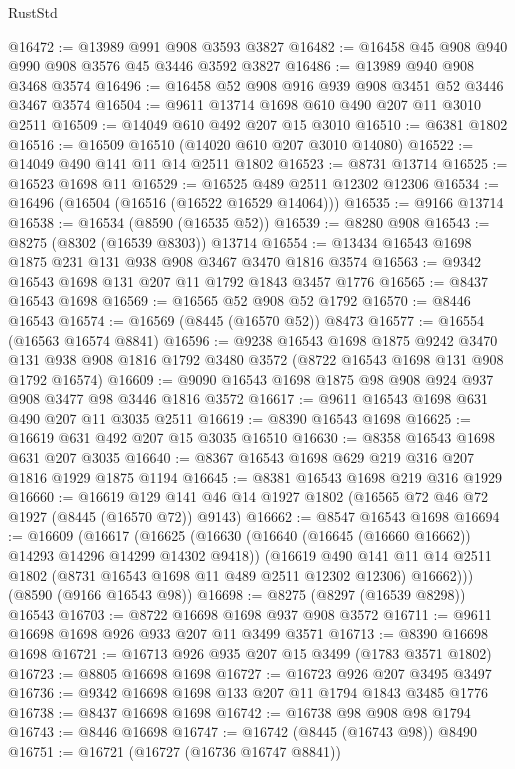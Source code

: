 \begin{lexlean}{RustStd}
\begin{coremodule}
@16472 := @13989 @991 @908 @3593 @3827
@16482 := @16458 @45 @908 @940 @990 @908 @3576 @45 @3446 @3592 @3827
@16486 := @13989 @940 @908 @3468 @3574
@16496 := @16458 @52 @908 @916 @939 @908 @3451 @52 @3446 @3467 @3574
@16504 := @9611 @13714 @1698 @610 @490 @207 @11 @3010 @2511
@16509 := @14049 @610 @492 @207 @15 @3010
@16510 := @6381 @1802
@16516 := @16509 @16510 (@14020 @610 @207 @3010 @14080)
@16522 := @14049 @490 @141 @11 @14 @2511 @1802
@16523 := @8731 @13714
@16525 := @16523 @1698 @11
@16529 := @16525 @489 @2511 @12302 @12306
@16534 := @16496 (@16504 (@16516 (@16522 @16529 @14064)))
@16535 := @9166 @13714
@16538 := @16534 (@8590 (@16535 @52))
@16539 := @8280 @908
@16543 := @8275 (@8302 (@16539 @8303)) @13714
@16554 := @13434 @16543 @1698 @1875 @231 @131 @938 @908 @3467 @3470 @1816 @3574
@16563 := @9342 @16543 @1698 @131 @207 @11 @1792 @1843 @3457 @1776
@16565 := @8437 @16543 @1698
@16569 := @16565 @52 @908 @52 @1792
@16570 := @8446 @16543
@16574 := @16569 (@8445 (@16570 @52)) @8473
@16577 := @16554 (@16563 @16574 @8841)
@16596 := @9238
    @16543
    @1698
    @1875
    @9242
    @3470
    @131
    @938
    @908
    @1816
    @1792
    @3480
    @3572
    (@8722 @16543 @1698 @131 @908 @1792 @16574)
@16609 := @9090 @16543 @1698 @1875 @98 @908 @924 @937 @908 @3477 @98 @3446 @1816 @3572
@16617 := @9611 @16543 @1698 @631 @490 @207 @11 @3035 @2511
@16619 := @8390 @16543 @1698
@16625 := @16619 @631 @492 @207 @15 @3035 @16510
@16630 := @8358 @16543 @1698 @631 @207 @3035
@16640 := @8367 @16543 @1698 @629 @219 @316 @207 @1816 @1929 @1875 @1194
@16645 := @8381 @16543 @1698 @219 @316 @1929
@16660 := @16619 @129 @141 @46 @14 @1927 @1802 (@16565 @72 @46 @72 @1927 (@8445 (@16570 @72)) @9143)
@16662 := @8547 @16543 @1698
@16694 := @16609
    (@16617
      (@16625
        (@16630 (@16640 (@16645 (@16660 @16662)) @14293 @14296 @14299 @14302 @9418))
        (@16619
          @490
          @141
          @11
          @14
          @2511
          @1802
          (@8731 @16543 @1698 @11 @489 @2511 @12302 @12306)
          @16662)))
    (@8590 (@9166 @16543 @98))
@16698 := @8275 (@8297 (@16539 @8298)) @16543
@16703 := @8722 @16698 @1698 @937 @908 @3572
@16711 := @9611 @16698 @1698 @926 @933 @207 @11 @3499 @3571
@16713 := @8390 @16698 @1698
@16721 := @16713 @926 @935 @207 @15 @3499 (@1783 @3571 @1802)
@16723 := @8805 @16698 @1698
@16727 := @16723 @926 @207 @3495 @3497
@16736 := @9342 @16698 @1698 @133 @207 @11 @1794 @1843 @3485 @1776
@16738 := @8437 @16698 @1698
@16742 := @16738 @98 @908 @98 @1794
@16743 := @8446 @16698
@16747 := @16742 (@8445 (@16743 @98)) @8490
@16751 := @16721 (@16727 (@16736 @16747 @8841))

\end{coremodule}
\end{lexlean}
